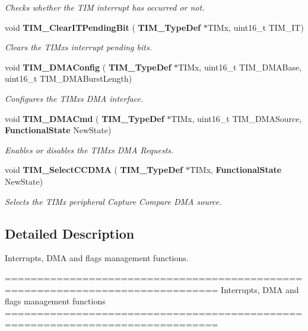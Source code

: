 \begin{DoxyCompactItemize}
\begin{DoxyCompactList}\small\item\em Checks whether the T\+IM interrupt has occurred or not. \end{DoxyCompactList}\item 
void \textbf{ T\+I\+M\+\_\+\+Clear\+I\+T\+Pending\+Bit} (\textbf{ T\+I\+M\+\_\+\+Type\+Def} $\ast$T\+I\+Mx, uint16\+\_\+t T\+I\+M\+\_\+\+IT)
\begin{DoxyCompactList}\small\item\em Clears the T\+I\+Mx\textquotesingle{}s interrupt pending bits. \end{DoxyCompactList}\item 
void \textbf{ T\+I\+M\+\_\+\+D\+M\+A\+Config} (\textbf{ T\+I\+M\+\_\+\+Type\+Def} $\ast$T\+I\+Mx, uint16\+\_\+t T\+I\+M\+\_\+\+D\+M\+A\+Base, uint16\+\_\+t T\+I\+M\+\_\+\+D\+M\+A\+Burst\+Length)
\begin{DoxyCompactList}\small\item\em Configures the T\+I\+Mx\textquotesingle{}s D\+MA interface. \end{DoxyCompactList}\item 
void \textbf{ T\+I\+M\+\_\+\+D\+M\+A\+Cmd} (\textbf{ T\+I\+M\+\_\+\+Type\+Def} $\ast$T\+I\+Mx, uint16\+\_\+t T\+I\+M\+\_\+\+D\+M\+A\+Source, \textbf{ Functional\+State} New\+State)
\begin{DoxyCompactList}\small\item\em Enables or disables the T\+I\+Mx\textquotesingle{}s D\+MA Requests. \end{DoxyCompactList}\item 
void \textbf{ T\+I\+M\+\_\+\+Select\+C\+C\+D\+MA} (\textbf{ T\+I\+M\+\_\+\+Type\+Def} $\ast$T\+I\+Mx, \textbf{ Functional\+State} New\+State)
\begin{DoxyCompactList}\small\item\em Selects the T\+I\+Mx peripheral Capture Compare D\+MA source. \end{DoxyCompactList}\end{DoxyCompactItemize}


\subsection{Detailed Description}
Interrupts, D\+MA and flags management functions. 

\begin{DoxyVerb} ===============================================================================
                 Interrupts, DMA and flags management functions
 ===============================================================================  \end{DoxyVerb}
 

